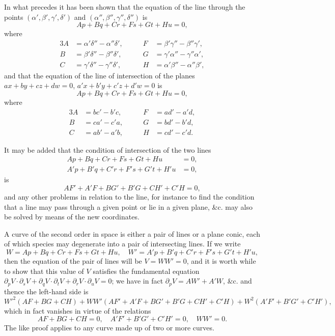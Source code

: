 \documentclass[11pt,a4paper]{book}
\begin{document}
In what precedes it has been shown that the equation of the line through the points $(\alpha', \beta', \gamma', \delta')$ and $(\alpha'', \beta'', \gamma'', \delta'')$ is
\[
Ap + Bq + Cr + Fs + Gt + Hu = 0,
\]
where
\begin{alignat*}{3}
A &= \alpha'\delta'' - \alpha''\delta', &\qquad F &= \beta'\gamma'' - \beta''\gamma',\\
B &= \beta'\delta'' - \beta''\delta', &\qquad G &= \gamma'\alpha'' - \gamma''\alpha',\\
C &= \gamma'\delta'' - \gamma''\delta', &\qquad H &= \alpha'\beta'' - \alpha''\beta',
\end{alignat*}
and that the equation of the line of intersection of the planes $ax + by + cz + dw = 0$, $a'x + b'y + c'z + d'w = 0$ is
\[
Ap + Bq + Cr + Fs + Gt + Hu = 0,
\]
where
\begin{alignat*}{3}
A &= bc' - b'c, &\qquad F &= ad' - a'd,\\
B &= ca' - c'a, &\qquad G &= bd' - b'd,\\
C &= ab' - a'b, &\qquad H &= cd' - c'd.
\end{alignat*}

It may be added that the condition of intersection of the two lines
\begin{align*}
Ap + Bq + Cr + Fs + Gt + Hu &= 0,\\
A'p + B'q + C'r + F's + G't + H'u &= 0,
\end{align*}
is
\[
AF' + A'F + BG' + B'G + CH' + C'H = 0,
\]
and any other problems in relation to the line, for instance to find the condition that a line may pass through a given point or lie in a given plane, \&c. may also be solved by means of the new coordinates.

A curve of the second order in space is either a pair of lines or a plane conic, each of which species may degenerate into a pair of intersecting lines. If we write
\[
W = Ap + Bq + Cr + Fs + Gt + Hu,\quad W' = A'p + B'q + C'r + F's + G't + H'u,
\]
then the equation of the pair of lines will be $V = WW' = 0$, and it is worth while to show that this value of $V$ satisfies the fundamental equation $\partial_p V \cdot \partial_s V + \partial_q V \cdot \partial_t V + \partial_r V \cdot \partial_u V = 0$; we have in fact $\partial_p V = AW' + A'W$, \&c. and thence the left-hand side is
\[
W'^2(AF + BG + CH) + WW'(AF' + A'F + BG' + B'G + CH' + C'H) + W^2(A'F' + B'G' + C'H'),
\]
which in fact vanishes in virtue of the relations
\[
AF + BG + CH = 0,\quad A'F' + B'G' + C'H' = 0,\quad WW' = 0.
\]
The like proof applies to any curve made up of two or more curves.
\end{document}
